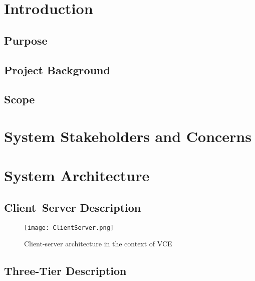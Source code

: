\documentclass[11pt,a4paper]{report}
\begin{document}
\thispagestyle{empty}
\renewcommand\contentsname{Table of Contents}\tableofcontents
\listoffigures
\pagebreak

\pagestyle{fancy}
\cfoot{\thepage}
\renewcommand{\headrulewidth}{0.4pt}
\renewcommand{\footrulewidth}{0.4pt}


\section{Introduction}

\subsection{Purpose}

\subsection{Project Background}

\subsection{Scope}

\section{System Stakeholders and Concerns}

\section{System Architecture}
	
\subsection{Client--Server Description}

	\begin{figure}[h!]
		\centering
		\texttt{[image: ClientServer.png]}
		\caption{Client-server architecture in the context of VCE}
	\end{figure}
	
\subsection{Three-Tier Description}
\end{document}
